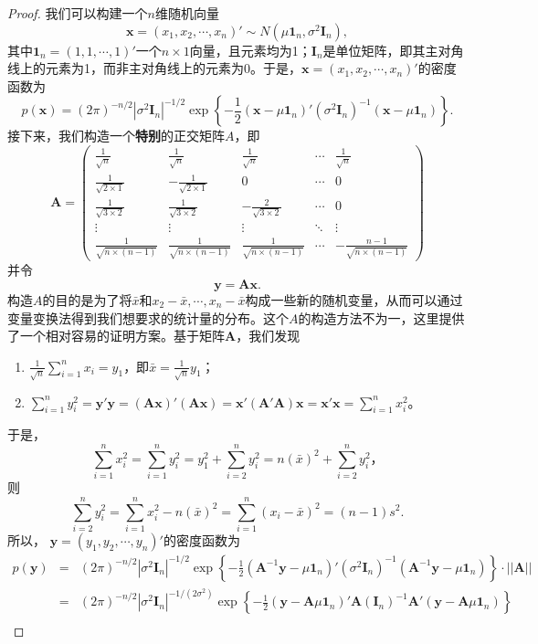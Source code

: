 \begin{proof}
我们可以构建一个$n$维随机向量$$
\bm{x} = (x_1,x_2,\cdots,x_n)' \sim N(\mu \bm{1}_n,\sigma^2 \bm{I}_n),
$$
其中$\bm{1}_n = (1,1,\cdots,1)'$一个$n\times 1$向量，且元素均为1；$\bm{I}_n$是单位矩阵，即其主对角线上的元素为1，而非主对角线上的元素为0。于是，$\bm{x} = (x_1,x_2,\cdots,x_n)'$的密度函数为
$$
p(\bm{x}) = (2\pi)^{-n/2}  |\sigma^2\bm{I}_n|^{-1/2} \exp\left\{-\frac{1}{2} (\bm{x}-\mu \bm{1}_n)' (\sigma^2 \bm{I}_n)^{-1} (\bm{x}-\mu \bm{1}_n)\right\}.
$$
接下来，我们构造一个\textbf{特别}的正交矩阵$A$，即
$$\bm{A}=\left(\begin{array}{ccccc}
	\frac{1}{\sqrt{n}} & \frac{1}{\sqrt{n}} & \frac{1}{\sqrt{n}} & \cdots & \frac{1}{\sqrt{n}} \\
	\frac{1}{\sqrt{2 \times 1}} & -\frac{1}{\sqrt{2 \times 1}} & 0 & \cdots & 0 \\
	\frac{1}{\sqrt{3 \times 2}} & \frac{1}{\sqrt{3 \times 2}} & -\frac{2}{\sqrt{3 \times 2}} & \cdots & 0 \\
	\vdots & \vdots & \vdots & \ddots & \vdots \\
	\frac{1}{\sqrt{n \times(n-1)}} & \frac{1}{\sqrt{n \times(n-1)}} &\frac{1}{\sqrt{n \times(n-1)}}& \cdots & -\frac{n-1}{\sqrt{n \times(n-1)}}
\end{array}\right)$$
并令$$\bm{y} = \bm{A} \bm{x}.$$
构造$A$的目的是为了将$\bar{x}$和$x_2-\bar{x},\cdots,x_n - \bar{x}$构成一些新的随机变量，从而可以通过变量变换法得到我们想要求的统计量的分布。这个$A$的构造方法不为一，这里提供了一个相对容易的证明方案。基于矩阵$\bm{A}$，我们发现
\begin{enumerate}
    \item $\frac{1}{\sqrt{n}} \sum_{i=1}^n x_i = y_1$，即$\bar{x} = \frac{1}{\sqrt{n}}y_1$；
    \item $\sum_{i=1}^n y_i^2 = \bm{y}'\bm{y} = (\bm{A}\bm{x})'(\bm{A}\bm{x}) = \bm{x}'(\bm{A}'\bm{A})\bm{x} = \bm{x}'\bm{x} = \sum_{i=1}^n x_i^2$。
\end{enumerate}
于是，
$$
\sum_{i=1}^n x_i^2= \sum_{i=1}^n y_i^2 = y_1^2 + \sum_{i=2}^n y_i^2 = n (\bar{x})^2 + \sum_{i=2}^n y_i^2，
$$
则$$
\sum_{i=2}^n y_i^2 = \sum_{i=1}^n x_i^2 - n(\bar{x})^2 = \sum_{i=1}^n (x_i -\bar{x})^2 = (n-1) s^2.
$$
所以， $\bm{y}=(y_1,y_2,\cdots,y_n)'$的密度函数为
\begin{eqnarray*}
p(\bm{y}) &=& (2\pi)^{-n/2} |\sigma^2 \bm{I}_n|^{-1/2} \exp\left\{-\frac{1}{2} (\bm{A}^{-1}\bm{y}-\mu \bm{1}_n)' (\sigma^2 \bm{I}_n)^{-1} (\bm{A}^{-1}\bm{y}-\mu \bm{1}_n)\right\} \cdot ||\bm{A}||\\
&=& (2\pi)^{-n/2} |\sigma^2 \bm{I}_n|^{-1/(2\sigma^2)} \exp\left\{-\frac{1}{2} (\bm{y}- \bm{A}\mu \bm{1}_n)' \bm{A} ( \bm{I}_n)^{-1} \bm{A}'(\bm{y}-\bm{A}\mu \bm{1}_n)\right\}\\

\end{eqnarray*}
\end{proof}
